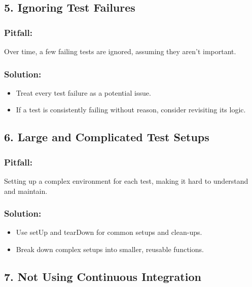 \subsection*{5. Ignoring Test Failures}

\subsubsection*{Pitfall:}

Over time, a few failing tests are ignored, assuming they aren't important.

\subsubsection*{Solution:}

\begin{itemize}
 \item Treat every test failure as a potential issue.
 \item If a test is consistently failing without reason, consider revisiting its logic.
\end{itemize}

\subsection*{6. Large and Complicated Test Setups}

\subsubsection*{Pitfall:}

Setting up a complex environment for each test, making it hard to understand and maintain.

\subsubsection*{Solution:}

\begin{itemize}
 \item Use setUp and tearDown for common setups and clean-ups.
 \item Break down complex setups into smaller, reusable functions.
\end{itemize}

\subsection*{7. Not Using Continuous Integration}


